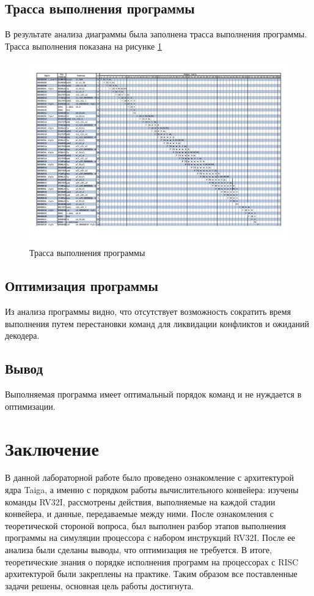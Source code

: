 \documentclass[12pt]{report}
\begin{document}
\section{Трасса выполнения программы}
В результате анализа диаграммы была заполнена трасса выполнения программы. Трасса выполнения показана на рисунке \ref{not_opt}

\begin{figure}[h!p]
	\centering
	\includegraphics[width = \linewidth]{not_opt.png}
	\caption{Трасса выполнения программы}
	\label{not_opt}
\end{figure}

\section{Оптимизация программы}
Из анализа программы видно, что отсутствует возможность сократить время выполнения путем перестановки команд для ликвидации конфликтов и ожиданий декодера.

\section*{Вывод}
Выполняемая программа имеет оптимальный порядок команд и не нуждается в оптимизации. 

\chapter*{Заключение}
В данной лабораторной работе было проведено ознакомление с архитектурой ядра Taiga, а именно с порядком работы вычислительного конвейера: изучены команды RV32I, рассмотрены действия, выполняемые на каждой стадии конвейера, и данные, передаваемые между ними.
После ознакомления с теоретической стороной вопроса, был выполнен разбор этапов выполнения программы на симуляции процессора с набором инструкций RV32I. После ее анализа были сделаны выводы, что оптимизация не требуется.
В итоге, теоретические знания о порядке исполнения программ на процессорах с RISC архитектурой были закреплены на практике.
Таким образом все поставленные задачи решены, основная цель работы достигнута.
\end{document}
